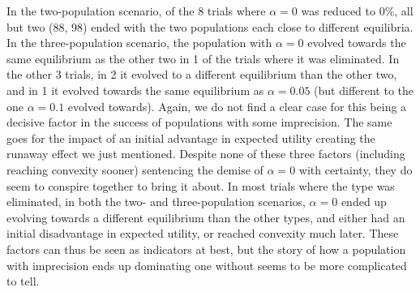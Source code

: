 \documentclass[a4paper]{article}
\begin{document}
In the two-population scenario, of the 8 trials where $\alpha = 0$ was reduced to 0\%, all but two (88, 98) ended with the two populations each close to different equilibria.
In the three-population scenario, the population with $\alpha = 0$ evolved towards the same equilibrium as the other two in 1 of the trials where it was eliminated.
In the other 3 trials, in 2 it evolved to a different equilibrium than the other two, and in 1 it evolved towards the same equilibrium as $\alpha = 0.05$ (but different to the one $\alpha = 0.1$ evolved towards).
Again, we do not find a clear case for this being a decisive factor in the success of populations with some imprecision.
The same goes for the impact of an initial advantage in expected utility creating the runaway effect we just mentioned.
Despite none of these three factors (including reaching convexity sooner) sentencing the demise of $\alpha = 0$ with certainty, they do seem to conspire together to bring it about.
In most trials where the type was eliminated, in both the two- and three-population scenarios, $\alpha = 0$ ended up evolving towards a different equilibrium than the other types, and either had an initial disadvantage in expected utility, or reached convexity much later.
These factors can thus be seen as indicators at best, but the story of how a population with imprecision ends up dominating one without seems to be more complicated to tell.
\end{document}

